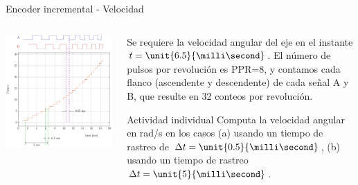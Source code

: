 \documentclass[presentation,aspectratio=169]{beamer}
\begin{document}
\begin{frame}[label={sec:org329bda1}]{Encoder incremental - Velocidad}
\begin{columns}
\begin{column}{0.5\columnwidth}
\begin{center}
\includegraphics[width=\textwidth]{../../figures/encoder-signals-nonuniform}
\end{center}
\end{column}
\begin{column}{0.5\columnwidth}
Se requiere la velocidad angular del eje en el instante \(t=\unit{6.5}{\milli\second}\). El número de pulsos por revolución es PPR=8, y contamos cada flanco (ascendente y descendente) de cada señal A y B, que resulte en 32 conteos por revolución.

\alert{Actividad individual} Computa la velocidad angular en rad/s en los casos \alert{(a)} usando un tiempo de rastreo de \(\Delta t=\unit{0.5}{\milli\second}\), \alert{(b)} usando un tiempo de rastreo \(\Delta t=\unit{5}{\milli\second}\).
\end{column}
\end{columns}
\end{frame}
\end{document}
